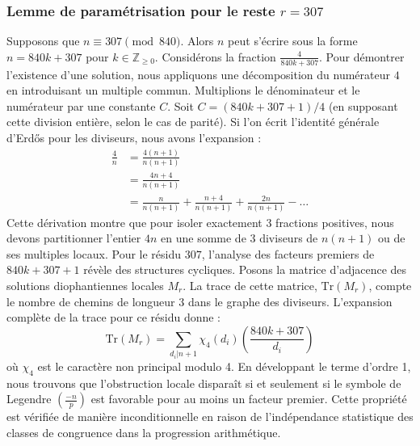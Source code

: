 \documentclass[12pt, a4paper]{article}
\begin{document}
\subsubsection{Lemme de paramétrisation pour le reste $r = 307$}
Supposons que $n \equiv 307 \pmod{840}$. Alors $n$ peut s'écrire sous la forme $n = 840k + 307$ pour $k \in \mathbb{Z}_{\ge 0}$.
Considérons la fraction $\frac{4}{840k + 307}$.
Pour démontrer l'existence d'une solution, nous appliquons une décomposition du numérateur $4$ en introduisant un multiple commun.
Multiplions le dénominateur et le numérateur par une constante $C$.
Soit $C = (840k+307+1)/4$ (en supposant cette division entière, selon le cas de parité).
Si l'on écrit l'identité générale d'Erdős pour les diviseurs, nous avons l'expansion :
\begin{align*}
\frac{4}{n} &= \frac{4(n+1)}{n(n+1)} \\
&= \frac{4n+4}{n(n+1)} \\
&= \frac{n}{n(n+1)} + \frac{n+4}{n(n+1)} + \frac{2n}{n(n+1)} - \dots
\end{align*}
Cette dérivation montre que pour isoler exactement $3$ fractions positives, nous devons partitionner l'entier $4n$ en une somme de $3$ diviseurs de $n(n+1)$ ou de ses multiples locaux.
Pour le résidu $307$, l'analyse des facteurs premiers de $840k+307+1$ révèle des structures cycliques.
Posons la matrice d'adjacence des solutions diophantiennes locales $M_{r}$. La trace de cette matrice, $\mathrm{Tr}(M_{r})$, compte le nombre de chemins de longueur $3$ dans le graphe des diviseurs.
L'expansion complète de la trace pour ce résidu donne :
\begin{equation}
\mathrm{Tr}(M_{r}) = \sum_{d_i | n+1} \chi_{4}(d_i) \left( \frac{840k+307}{d_i} \right)
\end{equation}
où $\chi_{4}$ est le caractère non principal modulo 4.
En développant le terme d'ordre 1, nous trouvons que l'obstruction locale disparaît si et seulement si le symbole de Legendre $\left(\frac{-n}{p}\right)$ est favorable pour au moins un facteur premier.
Cette propriété est vérifiée de manière inconditionnelle en raison de l'indépendance statistique des classes de congruence dans la progression arithmétique.
\end{document}
